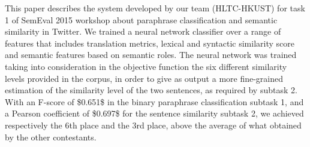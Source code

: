 This paper describes the system developed by our team (HLTC-HKUST) for task 1 of SemEval 2015 workshop about paraphrase classification and semantic similarity in Twitter. We trained a neural network classifier over a range of features that includes translation metrics, lexical and syntactic similarity score and semantic features based on semantic roles. The neural network was trained taking into consideration in the objective function the six different similarity levels provided in the corpus, in order to give as output a more fine-grained estimation of the similarity level of the two sentences, as required by subtask 2. With an F-score of \$0.651\$ in the binary paraphrase classification subtask 1, and a Pearson coefficient of \$0.697\$ for the sentence similarity subtask 2, we achieved respectively the 6th place and the 3rd place, above the average of what obtained by the other contestants.
